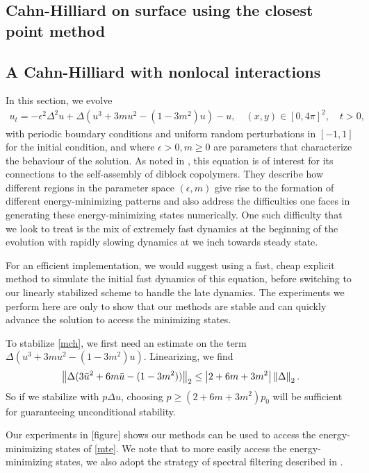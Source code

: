 \subsection{Cahn-Hilliard on surface using the closest point method}


\subsection{A Cahn-Hilliard with nonlocal interactions}
In this section, we evolve 
\begin{align}
        u_t = -\epsilon^2 \Delta^2 u + \Delta (u^3 + 3mu^2 - (1-3m^2)u) - u, 
\quad (x,y)\in[0,4\pi]^2,
\quad t>0,
\label{mch}
\end{align}
with periodic boundary conditions and uniform random perturbations in $[-1,1]$ for the initial condition, and where $\epsilon>0, m\geq 0$ are parameters that characterize the behaviour of the solution. As noted in \cite{choksi2009phase,choksi20112d}, this equation is of interest for its connections to the self-assembly of diblock copolymers. They describe how different regions in the parameter space $(\epsilon, m)$ give rise to the formation of different energy-minimizing patterns and also address the difficulties one faces in generating these energy-minimizing states numerically. One such difficulty that we look to treat is the mix of extremely fast dynamics at the beginning of the evolution with rapidly slowing dynamics at we inch towards steady state.  

For an efficient implementation, we would suggest using a fast, cheap explicit method to simulate the initial fast dynamics of this equation, before switching to our linearly stabilized scheme to handle the late dynamics. The experiments we perform here are only to show that our methods are stable and can quickly advance the solution to access the minimizing states. 

To stabilize \cref{mch}, we first need an estimate on the term $\Delta(u^3 + 3mu^2-(1-3m^2)u)$. Linearizing, we find
\begin{align}
        \left\lVert\Delta(3\bar u^2 + 6m\bar u - (1-3m^2))\right\rVert_2 
\leq \left|2+6m+3m^2\right|\left\lVert\Delta\right\rVert_2.
\end{align}
So if we stabilize with $p\Delta u$, choosing $p \geq (2+6m+3m^2)p_0$ will be sufficient for guaranteeing unconditional stability.

Our experiments in [figure] shows our methods can be used to access the energy-minimizing states of \cref{mte}. 
We note that to more easily access the energy-minimizing states, we also adopt the strategy of spectral filtering described in \cite{choksi20112d}. 

